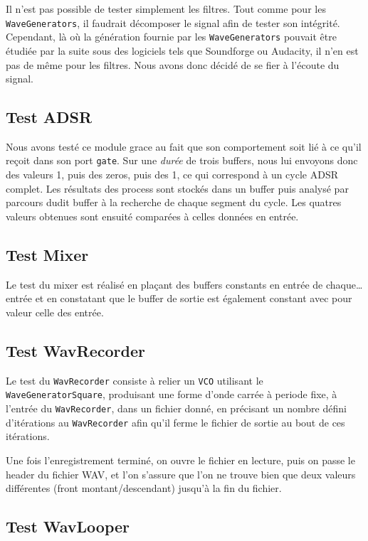 Il n'est pas possible de tester simplement les filtres. Tout comme
pour les \verb!WaveGenerators!, il faudrait décomposer le signal
afin de tester son intégrité. Cependant, là où la génération
fournie par les \verb!WaveGenerators! pouvait être étudiée par la
suite sous des logiciels tels que Soundforge ou Audacity, il n'en
est pas de même pour les filtres. Nous avons donc décidé de se fier
à l'écoute du signal.

\subsection{Test ADSR}

Nous avons testé ce module grace au fait que son comportement soit lié à ce qu'il reçoit dans son port \texttt{gate}. Sur une \textit{durée} de trois buffers, nous lui envoyons donc des valeurs 1, puis des zeros, puis des 1, ce qui correspond à un cycle ADSR complet. Les résultats des \og{}process\fg{} sont stockés dans un buffer puis analysé par parcours dudit buffer à la recherche de chaque segment du cycle. Les quatres valeurs obtenues sont ensuité comparées à celles données en entrée.


\subsection{Test Mixer}

Le test du mixer est réalisé en plaçant des buffers constants en entrée de chaque\dots entrée et en constatant que le buffer de sortie est également constant avec pour valeur celle des entrée.


\subsection{Test WavRecorder}

Le test du \verb!WavRecorder! consiste à relier un \verb!VCO!
utilisant le \verb!WaveGeneratorSquare!, produisant une forme
d'onde carrée à periode fixe, à l'entrée du \verb!WavRecorder!,
dans un fichier donné, en précisant un nombre défini d'itérations
au \verb!WavRecorder! afin qu'il ferme le fichier de sortie au bout
de ces itérations.

Une fois l'enregistrement terminé, on ouvre le fichier en lecture,
puis on passe le header du fichier WAV, et l'on s'assure que l'on
ne trouve bien que deux valeurs différentes (front
montant/descendant) jusqu'à la fin du fichier.

\subsection{Test WavLooper}

